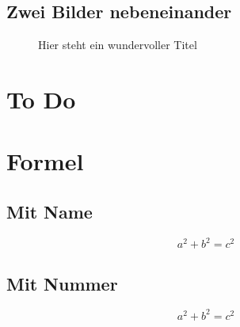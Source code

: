 \subsection{Zwei Bilder nebeneinander}
\begin{figure}[H]
	\centering
	\hspace{1em} %
	
	\caption{Hier steht ein wundervoller Titel}
	\label{Image:Beispiel2}
\end{figure}

\section{To Do}

\section{Formel}
\subsection{Mit Name}
\begin{equation}
	\tag{Satz des Pythagoras}
	a^2 + b^2 = c^2
	\label{equation:SatzDesPythagoras}
\end{equation}

\subsection{Mit Nummer}
\begin{equation}
	a^2 + b^2 = c^2
	\label{equation:SatzDesPythagoras}
\end{equation}

